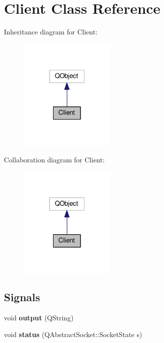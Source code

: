 \hypertarget{classClient}{}\section{Client Class Reference}
\label{classClient}


Inheritance diagram for Client\+:
\nopagebreak
\begin{figure}[H]
\begin{center}
\leavevmode
\includegraphics[width=133pt]{classClient__inherit__graph}
\end{center}
\end{figure}


Collaboration diagram for Client\+:
\nopagebreak
\begin{figure}[H]
\begin{center}
\leavevmode
\includegraphics[width=133pt]{classClient__coll__graph}
\end{center}
\end{figure}
\subsection*{Signals}
\begin{DoxyCompactItemize}
\item 
\mbox{\label{classClient_a6b2f5f43de87c2d97a6438e467c16b5c}} 
void {\bfseries output} (Q\+String)
\item 
\mbox{\label{classClient_a5d55e10c7cc67ac9118d43ccce5bec6a}} 
void {\bfseries status} (Q\+Abstract\+Socket\+::\+Socket\+State s)
\end{DoxyCompactItemize}
